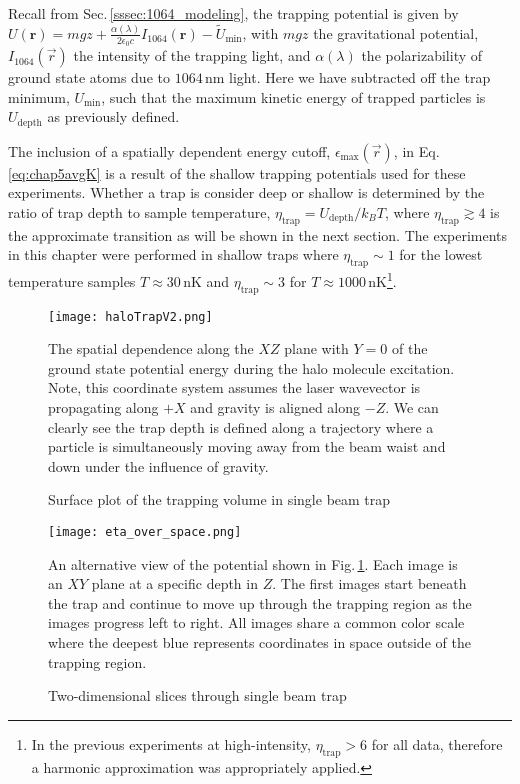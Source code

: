 Recall from Sec.\,\ref{sssec:1064_modeling}, the trapping potential is given by $U(\mathbf{r})=mgz + \frac{\alpha(\lambda)}{2 \epsilon_0 c} I_{1064}(\mathbf{r})-\tilde{U}_{\text{min}}$, with $mgz$ the gravitational potential, $I_{1064}(\vec{r})$ the intensity of the trapping light, and $\alpha(\lambda)$ the polarizability of ground state atoms due to $1064$\,nm light.
Here we have subtracted off the trap minimum, $U_{\text{min}}$, such that the maximum kinetic energy of trapped particles is $U_{\text{depth}}$ as previously defined.

The inclusion of a spatially dependent energy cutoff, $\epsilon_{\text{max}}(\vec{r})$, in Eq.\,\ref{eq:chap5avgK} is a result of the shallow trapping potentials used for these experiments.
Whether a trap is consider deep or shallow is determined by the ratio of trap depth to sample temperature, $\eta_{\text{trap}} = U_\text{depth}/k_B T$, where $\eta_{\text{trap}} \gtrsim 4$ is the approximate transition as will be shown in the next section.
The experiments in this chapter were performed in shallow traps where $\eta_\text{trap} \sim 1$ for the lowest temperature samples $T \approx 30$\,nK and $\eta_\text{trap} \sim 3$ for $T \approx 1000$\,nK\footnote{In the previous experiments at high-intensity, $\eta_\text{trap} > 6$ for all data, therefore a harmonic approximation was appropriately applied.}.

	\begin{figure} 
	\centerline{
	  \texttt{[image: haloTrapV2.png]}}
	  \caption{Surface plot of the trapping volume in single beam trap}{The spatial dependence along the $XZ$ plane with $Y=0$ of the ground state potential energy during the halo molecule excitation. Note, this coordinate system assumes the laser wavevector is propagating along $+X$ and gravity is aligned along $-Z$. We can clearly see the trap depth is defined along a trajectory where a particle is simultaneously moving away from the beam waist and down under the influence of gravity.}
	  \label{fig:haloTrapModel}
	\end{figure}
	
	\begin{figure} 
	\centerline{
	  \texttt{[image: eta\_over\_space.png]}}
	  \caption{Two-dimensional slices through single beam trap}{An alternative view of the potential shown in Fig.\,\ref{fig:haloTrapModel}. Each image is an $XY$ plane at a specific depth in $Z$. The first images start beneath the trap and continue to move up through the trapping region as the images progress left to right. All images share a common color scale where the deepest blue represents coordinates in space outside of the trapping region.}
	  \label{fig:halo2DTrapModel}
	\end{figure}
	

